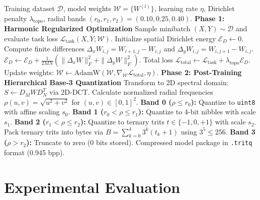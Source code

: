 \documentclass[11pt,a4paper]{article}
\begin{document}
\begin{algorithm}[t]
\caption{Dirichlet Regularized Training and Spectral Base-3 Trit Quantization (\texttt{.tritq})}
\label{alg:dreg_pipeline}
\begin{algorithmic}[1]
\REQUIRE Training dataset $\mathcal{D}$, model weights $\mathcal{W} = \{W^{(l)}\}$, learning rate $\eta$, Dirichlet penalty $\lambda_{\text{topo}}$, radial bands $(r_0, r_1, r_2) = (0.10, 0.25, 0.40)$.
\STATE \textbf{Phase 1: Harmonic Regularized Optimization}
    \STATE Sample minibatch $(X, Y) \sim \mathcal{D}$ and evaluate task loss $\mathcal{L}_{\text{task}}(X, Y; \mathcal{W})$.
    \STATE Initialize spatial Dirichlet energy $\mathcal{E}_D \leftarrow 0$.
        \STATE Compute finite differences $\Delta_x W_{i,j} = W_{i+1,j} - W_{i,j}$ and $\Delta_y W_{i,j} = W_{i,j+1} - W_{i,j}$.
        \STATE $\mathcal{E}_D \leftarrow \mathcal{E}_D + \frac{1}{2MN} \left( \|\Delta_x W\|_F^2 + \|\Delta_y W\|_F^2 \right)$.
    \ENDFOR
    \STATE Total loss $\mathcal{L}_{\text{total}} \leftarrow \mathcal{L}_{\text{task}} + \lambda_{\text{topo}} \mathcal{E}_D$.
    \STATE Update weights: $\mathcal{W} \leftarrow \text{AdamW}(\mathcal{W}, \nabla_{\mathcal{W}} \mathcal{L}_{\text{total}}, \eta)$.
\ENDFOR
\STATE \textbf{Phase 2: Post-Training Hierarchical Base-3 Quantization}
    \STATE Transform to 2D spectral domain: $S \leftarrow D_M W D_N^T$ via 2D-DCT.
    \STATE Calculate normalized radial frequencies $\rho(u, v) = \sqrt{u^2 + v^2}$ for $(u, v) \in [0, 1]^2$.
    \STATE \textbf{Band 0 ($\rho \le r_0$):} Quantize to \texttt{uint8} with affine scaling $s_0$.
    \STATE \textbf{Band 1 ($r_0 < \rho \le r_1$):} Quantize to 4-bit nibbles with scale $s_1$.
    \STATE \textbf{Band 2 ($r_1 < \rho \le r_2$):} Quantize to ternary trits $t \in \{-1, 0, +1\}$ with scale $s_2$.
    \STATE Pack ternary trits into bytes via $B = \sum_{k=0}^4 3^k (t_k + 1)$ using $3^5 \le 256$.
    \STATE \textbf{Band 3 ($\rho > r_2$):} Truncate to zero (0 bits stored).
\ENDFOR
\RETURN Compressed model package in \texttt{.tritq} format (0.945 bpp).
\end{algorithmic}
\end{algorithm}

\section{Experimental Evaluation}
\label{sec:experiments}
\end{document}
